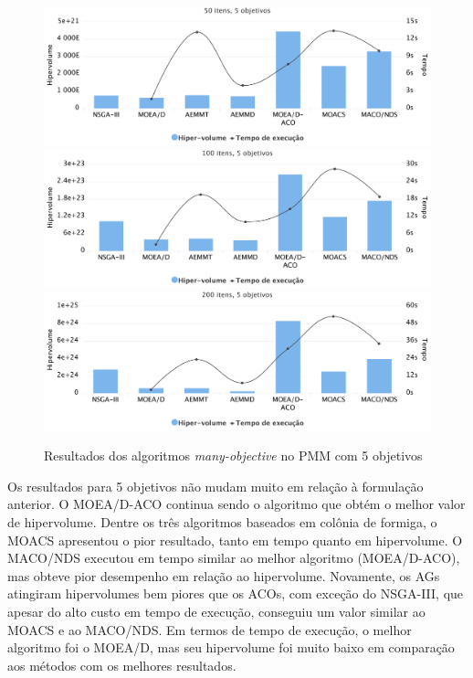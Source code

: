 \begin{figure}[!htbp]
	\includegraphics[width=1\textwidth]{cap_experimentos/figs/etapa4/i50o5}
	\includegraphics[width=1\textwidth]{cap_experimentos/figs/etapa4/i100o5}
	\includegraphics[width=1\textwidth]{cap_experimentos/figs/etapa4/i200o5}
	\caption{\label{fig_exp4_mkp_o5}Resultados dos algoritmos \textit{many-objective} no PMM com 5 objetivos}
\end{figure}

Os resultados para 5 objetivos não mudam muito em relação à formulação anterior. O MOEA/D-ACO continua sendo o algoritmo que obtém o melhor valor de hipervolume. Dentre os três algoritmos baseados em colônia de formiga, o MOACS apresentou o pior resultado, tanto em tempo quanto em hipervolume. O MACO/NDS executou em tempo similar ao melhor algoritmo (MOEA/D-ACO), mas obteve pior desempenho em relação ao hipervolume. Novamente, os AGs atingiram hipervolumes bem piores que os ACOs, com exceção do NSGA-III, que apesar do alto custo em tempo de execução, conseguiu um valor similar ao MOACS e ao MACO/NDS. Em termos de tempo de execução, o melhor algoritmo foi o MOEA/D, mas seu hipervolume foi muito baixo em comparação aos métodos com os melhores resultados.

